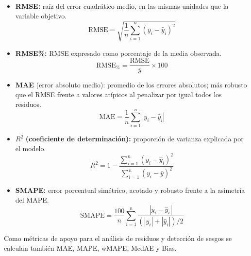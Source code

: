 \begin{itemize}
    \item \textbf{RMSE:} raíz del error cuadrático medio, en las mismas unidades que la variable objetivo.
          \begin{equation}
              \text{RMSE} = \sqrt{\frac{1}{n} \sum_{i=1}^{n} (y_i - \hat{y}_i)^2}
          \end{equation}

    \item \textbf{RMSE\%:} RMSE expresado como porcentaje de la media observada.
          \begin{equation}
              \text{RMSE}_{\%} = \frac{\text{RMSE}}{\bar{y}} \times 100
          \end{equation}

    \item \textbf{MAE} (error absoluto medio): promedio de los errores absolutos; más robusto que el RMSE frente a valores atípicos al penalizar por igual todos los residuos.
          \begin{equation}
              \text{MAE} = \frac{1}{n} \sum_{i=1}^{n} |y_i - \hat{y}_i|
          \end{equation}

    \item \boldmath\textbf{$R^2$}\unboldmath{} \textbf{(coeficiente de determinación):} proporción de varianza explicada por el modelo.
          \begin{equation}
              R^2 = 1 - \frac{\sum_{i=1}^{n} (y_i - \hat{y}_i)^2}{\sum_{i=1}^{n} (y_i - \bar{y})^2}
          \end{equation}

    \item \textbf{SMAPE:} error porcentual simétrico, acotado y robusto frente a la asimetría del MAPE.
          \begin{equation}
              \text{SMAPE} = \frac{100}{n} \sum_{i=1}^{n} \frac{|y_i - \hat{y}_i|}{(|y_i| + |\hat{y}_i|)/2}
          \end{equation}
\end{itemize}

Como métricas de apoyo para el análisis de residuos y detección de sesgos se calculan también MAE, MAPE, wMAPE, MedAE y Bias.


